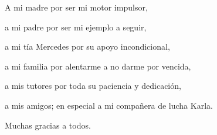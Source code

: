 \begin{dedication}
    A mi madre por ser mi motor impulsor,

    a mi padre por ser mi ejemplo a seguir,

    a mi tía Mercedes por su apoyo incondicional,

    a mi familia por alentarme a no darme por vencida,

    a mis tutores por toda su paciencia y dedicación,

    a mis amigos; en especial a mi compañera de lucha Karla.
    
    Muchas gracias a todos.
\end{dedication}
